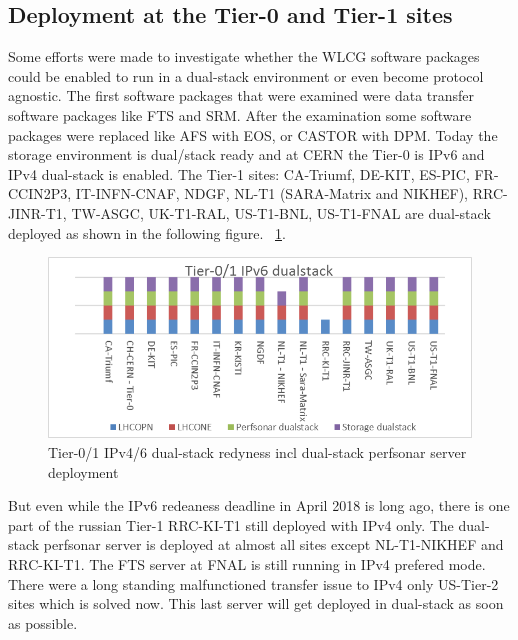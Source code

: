 %
\subsection{Deployment at the Tier-0 and Tier-1 sites}
Some efforts were made to investigate whether the WLCG software packages could be enabled to run in a dual-stack environment or even become protocol agnostic. The first software packages that were examined were data transfer software packages like FTS and SRM. After the examination some software packages were replaced like AFS with EOS, or CASTOR with DPM. Today the storage environment is dual/stack ready and at CERN the Tier-0 is IPv6 and IPv4 dual-stack is enabled. The Tier-1 sites: CA-Triumf, DE-KIT, ES-PIC, FR-CCIN2P3, IT-INFN-CNAF, NDGF, NL-T1 (SARA-Matrix and NIKHEF), RRC-JINR-T1, TW-ASGC, UK-T1-RAL, US-T1-BNL, US-T1-FNAL are dual-stack deployed as shown in the following figure. ~\ref{fig:t1ds}.
\begin{figure}[b]
\centering
\includegraphics[width=13cm]{hepix-ipv6-tier01-dual-stack.png}
\caption{Tier-0/1 IPv4/6 dual-stack redyness incl dual-stack perfsonar server deployment}
\label{fig:t1ds}
\end{figure}

But even while the IPv6 redeaness deadline in April 2018 is long ago, there is one part of the russian Tier-1 RRC-KI-T1 still deployed with IPv4 only. The dual-stack perfsonar server is deployed at almost all sites except NL-T1-NIKHEF and RRC-KI-T1. The FTS server at FNAL is still running in IPv4 prefered mode. There were a long standing malfunctioned transfer issue to IPv4 only US-Tier-2 sites which is solved now. This last server will get deployed in dual-stack as soon as possible.   
